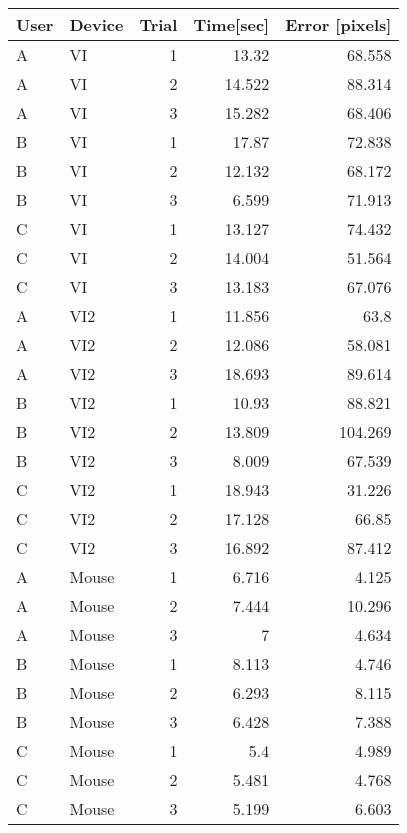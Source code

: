 \begin{tabular}{llrrr}
 \toprule
 User & Device & Trial & Time[sec] & Error [pixels] \\
 \midrule
A	&	VI	&	1	&	13.32	&	68.558	\\
A	&	VI	&	2	&	14.522	&	88.314	\\
A	&	VI	&	3	&	15.282	&	68.406	\\
B	&	VI	&	1	&	17.87	&	72.838	\\
B	&	VI	&	2	&	12.132	&	68.172	\\
B	&	VI	&	3	&	6.599	&	71.913	\\
C	&	VI	&	1	&	13.127	&	74.432	\\
C	&	VI	&	2	&	14.004	&	51.564	\\
C	&	VI	&	3	&	13.183	&	67.076	\\
A	&	VI2	&	1	&	11.856	&	63.8	\\
A	&	VI2	&	2	&	12.086	&	58.081	\\
A	&	VI2	&	3	&	18.693	&	89.614	\\
B	&	VI2	&	1	&	10.93	&	88.821	\\
B	&	VI2	&	2	&	13.809	&	104.269	\\
B	&	VI2	&	3	&	8.009	&	67.539	\\
C	&	VI2	&	1	&	18.943	&	31.226	\\
C	&	VI2	&	2	&	17.128	&	66.85	\\
C	&	VI2	&	3	&	16.892	&	87.412	\\
A	&	Mouse	&	1	&	6.716	&	4.125	\\
A	&	Mouse	&	2	&	7.444	&	10.296	\\
A	&	Mouse	&	3	&	7	&	4.634	\\
B	&	Mouse	&	1	&	8.113	&	4.746	\\
B	&	Mouse	&	2	&	6.293	&	8.115	\\
B	&	Mouse	&	3	&	6.428	&	7.388	\\
C	&	Mouse	&	1	&	5.4	&	4.989	\\
C	&	Mouse	&	2	&	5.481	&	4.768	\\
C	&	Mouse	&	3	&	5.199	&	6.603	\\
 \bottomrule
\end{tabular}
